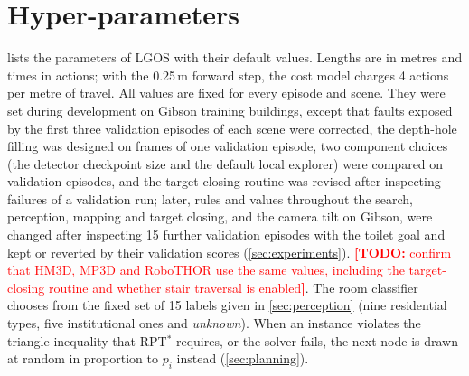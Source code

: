 \documentclass[10pt]{article}
\newcommand{\TODO}[1]{\textcolor{red}{\textbf{[TODO:} #1\textbf{]}}}
\newcommand{\ours}{LGOS\xspace}
\begin{document}
\section{Hyper-parameters}\label{app:hyperparams}

 lists the parameters of \ours with their default values. Lengths are in metres and times in actions; with the 0.25\,m forward step, the cost model charges 4 actions per metre of travel. All values are fixed for every episode and scene. They were set during development on Gibson training buildings, except that faults exposed by the first three validation episodes of each scene were corrected, the depth-hole filling was designed on frames of one validation episode, two component choices (the detector checkpoint size and the default local explorer) were compared on validation episodes, and the target-closing routine was revised after inspecting failures of a validation run; later, rules and values throughout the search, perception, mapping and target closing, and the camera tilt on Gibson, were changed after inspecting 15 further validation episodes with the toilet goal and kept or reverted by their validation scores (\cref{sec:experiments}). \TODO{confirm that HM3D, MP3D and RoboTHOR use the same values, including the target-closing routine and whether stair traversal is enabled}. The room classifier chooses from the fixed set of 15 labels given in \cref{sec:perception} (nine residential types, five institutional ones and \emph{unknown}). When an instance violates the triangle inequality that RPT$^*$ requires, or the solver fails, the next node is drawn at random in proportion to $p_i$ instead (\cref{sec:planning}).
\end{document}
